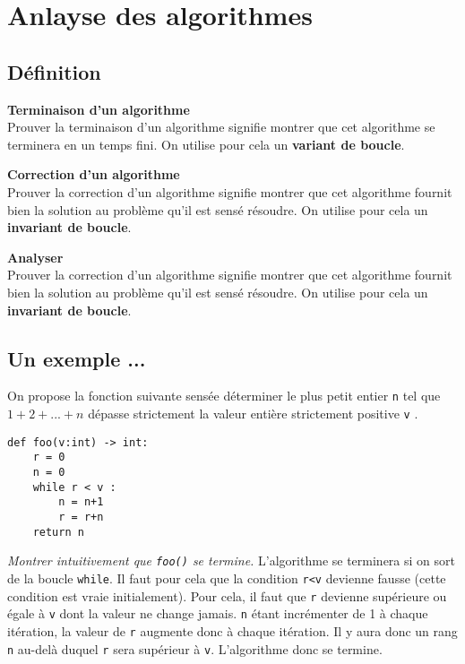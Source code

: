 \section{Anlayse des algorithmes}

\subsection{Définition}

\begin{defi}\textbf{Terminaison d'un algorithme} \\
Prouver la terminaison d'un algorithme signifie montrer que cet algorithme se terminera en un temps fini. On utilise pour cela un \textbf{variant de boucle}.
\end{defi}

\begin{defi}\textbf{Correction d'un algorithme} \\
Prouver la correction d'un algorithme signifie montrer que cet algorithme fournit bien la solution au problème qu'il est sensé résoudre. On utilise pour cela un \textbf{invariant de boucle}.
\end{defi}

\begin{defi}\textbf{Analyser} \\
Prouver la correction d'un algorithme signifie montrer que cet algorithme fournit bien la solution au problème qu'il est sensé résoudre. On utilise pour cela un \textbf{invariant de boucle}.
\end{defi}


\subsection{Un exemple ...}
On propose la fonction suivante sensée déterminer le plus petit entier \texttt{n} tel que $1 + 2 + . . . + n$ dépasse strictement la valeur entière strictement positive \texttt{v} .

\begin{lstlisting}
def foo(v:int) -> int:
    r = 0
    n = 0
    while r < v : 
        n = n+1
        r = r+n
    return n
\end{lstlisting}

\textit{Montrer intuitivement que \texttt{foo()} se termine.}
L'algorithme se terminera si on sort de la boucle \texttt{while}. Il faut pour cela que la condition \texttt{r<v} devienne fausse (cette condition est vraie initialement). Pour cela, il faut que \texttt{r} devienne supérieure ou égale à \texttt{v} dont la valeur ne change jamais. 
\texttt{n} étant incrémenter de 1 à chaque itération, la valeur de \texttt{r} augmente donc à chaque itération. Il y aura donc un rang \texttt{n} au-delà duquel \texttt{r} sera supérieur à \texttt{v}. L'algorithme donc se termine. 

